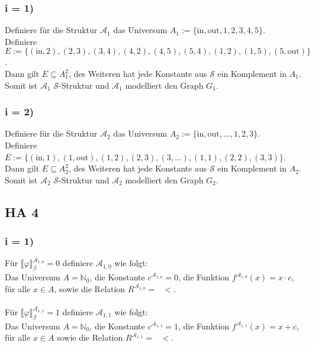\documentclass[12pt, a4paper]{article}
\newcommand{\lb}{\llbracket}
\newcommand{\rbb}{\rrbracket_{\beta}}
\begin{document}
\subsubsection*{i = 1)}
Definiere für die Struktur \(\mathcal A_1\) das Universum \(A_1 := \{\text{in}, \text{out}, 1, 2, 3, 4, 5\}\). \\
Definiere \(E := \{(\text{in}, 2), (2, 3), (3, 4), (4,2), (4,5), (5,4), (1,2), (1,5), (5, \text{out})\}\). \\
Dann gilt \(E \subseteq A_1^2\), des Weiteren hat jede Konstante aus \(\mathcal S\) ein Komplement in \(A_1\).\\
Somit ist \(\mathcal A_1\) \(\mathcal S\)-Struktur und \(\mathcal A_1\) modelliert den Graph \(G_1\).
\subsubsection*{i = 2)}
Definiere für die Struktur \(\mathcal A_2\) das Universum \(A_2 := \{\text{in}, \text{out}, \text{...}, 1, 2, 3\}\). \\
Definiere \(E := \{(\text{in}, 1), (1, \text{out}), (1, 2), (2,3), (3, \text{...}), (1,1), (2,2), (3,3)\}\). \\
Dann gilt \(E \subseteq A_2^2\), des Weiteren hat jede Konstante aus \(\mathcal S\) ein Komplement in \(A_2\).\\
Somit ist \(\mathcal A_2\) \(\mathcal S\)-Struktur und \(\mathcal A_2\) modelliert den Graph \(G_2\).
\subsection*{HA 4}
\subsubsection*{i = 1)}
Für \(\lb \varphi \rbb^{\mathcal{A}_{1,0}} = 0\) definiere \(\mathcal{A}_{1,0}\) wie folgt:\\
Das Universum \(A = \mathbb{N}_0\), die Konstante \(c^{\mathcal{A}_{1,0}} = 0\), die Funktion \(f^{\mathcal{A}_{1,0}}(x) = 
x \cdot c\), für alle \(x \in A\), sowie die Relation \(R^{\mathcal{A}_{1,0}} = \text{ } <\).\\\\
Für \(\lb \varphi \rbb^{\mathcal{A}_{1,1}} = 1\) definiere \(\mathcal{A}_{1,1}\) wie folgt:\\
Das Universum \(A = \mathbb{N}_{0}\), die Konstante \(c^{\mathcal{A}_{1,1}} = 1\), die Funktion \(f^{\mathcal{A}_{1,1}}(x) = 
x+c\), für alle \(x \in A\) sowie die Relation \(R^{\mathcal{A}_{1,1}} = \text{ } <\).
\end{document}
